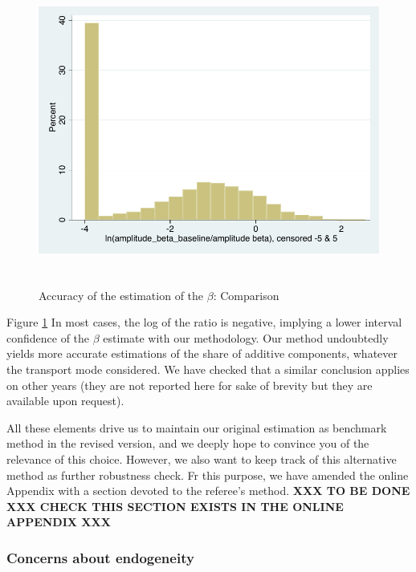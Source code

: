 \documentclass[a4paper,12pt]{article}
\begin{document}
\begin{itemize}
\begin{itemize}
\begin{figure}[htbp]
\caption{Accuracy of the estimation of the $\beta$: Comparison}
\label{fig:accuracy_beta}
\begin{center}
\includegraphics[height=4in]{accuracy_beta.pdf}
\end{center}
\end{figure}

Figure \ref{fig:accuracy_beta} In most cases, the log of the ratio is negative, implying a lower interval confidence of the $\beta$ estimate with our methodology. Our method undoubtedly yields more accurate estimations of the share of additive components, whatever the transport mode considered. We have checked that a similar conclusion applies on other years (they are not reported here for sake of brevity but they are available upon request).

\end{itemize}
\end{itemize}

All these elements drive us to maintain our original estimation as benchmark method in the revised version, and we deeply hope to convince you of the relevance of this choice. However, we also want to keep track of this alternative method as further robustness check. Fr this purpose, we have amended the online Appendix with a section devoted to the referee's method.\textbf{ XXX TO BE DONE XXX CHECK THIS SECTION EXISTS IN THE ONLINE APPENDIX XXX}




\subsubsection{Concerns about endogeneity}
\end{document}
